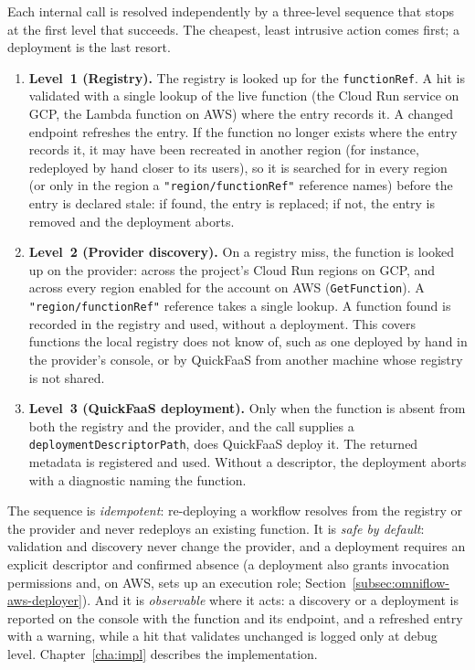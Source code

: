 Each internal call is resolved independently by a three-level sequence that stops at the first level
that succeeds. The cheapest, least intrusive action comes first; a deployment is the last resort.

\begin{enumerate}
  \item \textbf{Level~1 (Registry).} The registry is looked up for the \texttt{functionRef}. A hit
  is validated with a single lookup of the live function (the Cloud Run service on GCP, the Lambda
  function on AWS) where the entry records it. A changed endpoint refreshes the entry. If the
  function no longer exists where the entry records it, it may have been recreated in another region
  (for instance, redeployed by hand closer to its users), so it is searched for in every region
  (or only in the region a \texttt{"region/functionRef"} reference names) before the entry is
  declared stale: if found, the entry is replaced; if not, the entry is removed and the deployment
  aborts.
  \item \textbf{Level~2 (Provider discovery).} On a registry miss, the function is looked up on
  the provider: across the project's Cloud Run regions on GCP, and across every region enabled for
  the account on AWS (\texttt{GetFunction}). A \texttt{"region/functionRef"} reference takes a
  single lookup. A function found is recorded in the registry and used, without a deployment. This
  covers functions the local registry does not know of, such as one deployed by hand in the
  provider's console, or by QuickFaaS from another machine whose registry is not shared.
  \item \textbf{Level~3 (QuickFaaS deployment).} Only when the function is absent from both the
  registry and the provider, and the call supplies a \texttt{deploymentDescriptorPath}, does
  QuickFaaS deploy it. The returned metadata is registered and used. Without a descriptor, the
  deployment aborts with a diagnostic naming the function.
\end{enumerate}

The sequence is \emph{idempotent}: re-deploying a workflow resolves from the registry or the provider
and never redeploys an existing function. It is \emph{safe by default}: validation and discovery
never change the provider, and a deployment requires an explicit descriptor and confirmed absence
(a deployment also grants invocation permissions and, on AWS, sets up an execution role;
Section~\ref{subsec:omniflow-aws-deployer}). And it is \emph{observable} where it acts: a discovery
or a deployment is reported on the console with the function and its endpoint, and a refreshed
entry with a warning, while a hit that validates unchanged is logged only at debug level.
Chapter~\ref{cha:impl} describes the implementation.

